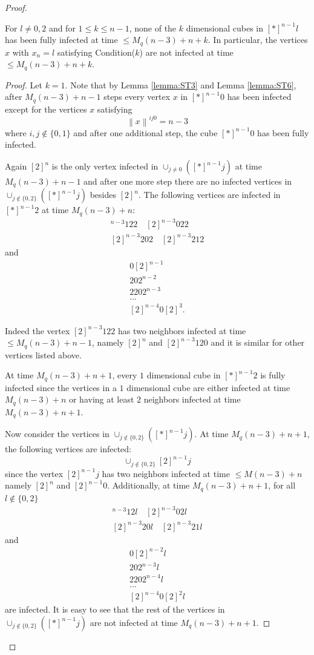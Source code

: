 \documentclass[10pt,a4paper]{amsart}
\renewcommand{\leq}{\leqslant}
\begin{document}
\begin{proof}
\begin{claim}
    
    For $l \neq 0,2$ and  for $ 1 \leq k \leq n-1$, none of the $k$ dimensional cubes in $[\ast]^{n-1}l$ has been fully infected at time $ \leq M_q(n-3)+n+k$. In particular, the vertices $x$ with $x_n=l$ satisfying Condition($k$) are not infected at time $ \leq M_q(n-3)+n+k$.
    
\end{claim} 
\begin{proof}
Let $k=1$. Note that by Lemma \ref{lemma:ST3} and Lemma \ref{lemma:ST6}, after $M_q(n-3)+n-1$ steps every vertex $x$ in $[\ast]^{n-1}0$ has been infected except for the vertices $x$ satisfying 
$$\left \lVert x \right \rVert^{ij0}= n-3$$
where $i,j \notin \{0,1\}$
and after one additional step, the cube $[\ast]^{n-1}0$ has been fully infected. 

Again $[2]^n$ is the only vertex infected in $\cup_{j \neq 0} ([\ast]^{n-1}j)$ at time $M_q(n-3)+n-1$ and after one more step there are no infected vertices in $\cup_{j \notin \{0,2\}} ([\ast]^{n-1}j)$ besides $[2]^n$. The following vertices are infected in $[\ast]^{n-1}2$ at time $M_{q}(n-3)+n$:
  \begin{gather*}
 [2]^{n-3}122 \quad [2]^{n-3}022\\
[2]^{n-3}202 \quad [2]^{n-3}212
   \end{gather*}
and 
\begin{gather*}
0[2]^{n-1}\\
202^{n-2}\\
2202^{n-3}\\
...\\
[2]^{n-4}0[2]^3.
\end{gather*}

Indeed the vertex $[2]^{n-3}122$ has two neighbors infected at time $ \leq M_q(n-3)+n-1$, namely $[2]^n$ and $[2]^{n-3}120$ and it is similar for other vertices listed above. 


At time $M_q(n-3)+n+1$, every $1$ dimensional cube in $[\ast]^{n-1}2$ is fully infected since the vertices in a $1$ dimensional cube are either infected at time $M_q(n-3)+n$ or having at least $2$ neighbors infected at time $M_q(n-3)+n+1$. 

Now consider the vertices in $\cup_{j \notin \{0,2\}} ([\ast]^{n-1}j)$. At time $M_q(n-3)+n+1$, the following vertices are infected:
$$\cup_{j \notin \{0,2\}}[2]^{n-1}j$$
since the vertex $[2]^{n-1}j$ has two neighbors infected at time $\leq M(n-3)+n$ namely $[2]^n$ and $[2]^{n-1}0$. Additionally, at time $M_q(n-3)+n+1$, for all $l \notin \{0,2\}$
  \begin{gather*}
 [2]^{n-3}12l \quad [2]^{n-3}02l\\
[2]^{n-3}20l \quad [2]^{n-3}21l
   \end{gather*}
and 
\begin{gather*}
0[2]^{n-2}l\\
202^{n-3}l\\
2202^{n-4}l\\
...\\
[2]^{n-4}0[2]^2l
\end{gather*}
are infected. It is easy to see that the rest of the vertices in $\cup_{j \notin \{0,2\}} ([\ast]^{n-1}j)$ are not infected at time $M_{q}(n-3)+n+1$.


\end{proof}
\end{proof}
\end{document}
